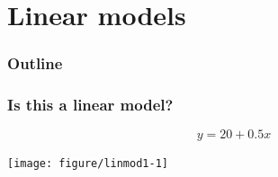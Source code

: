 \documentclass[color=usenames,dvipsnames]{beamer}\usepackage[]{graphicx}\usepackage[]{color}
\begin{document}









\section{Linear models}



\begin{frame}
  \frametitle{Outline}
  \LARGE
\end{frame}



\begin{frame}[fragile]
  \frametitle{Is this a linear model?}
\[
y = 20 + 0.5 x
\]

\begin{center}
  \texttt{[image: figure/linmod1-1]}
\end{center}
\end{frame}
\end{document}

